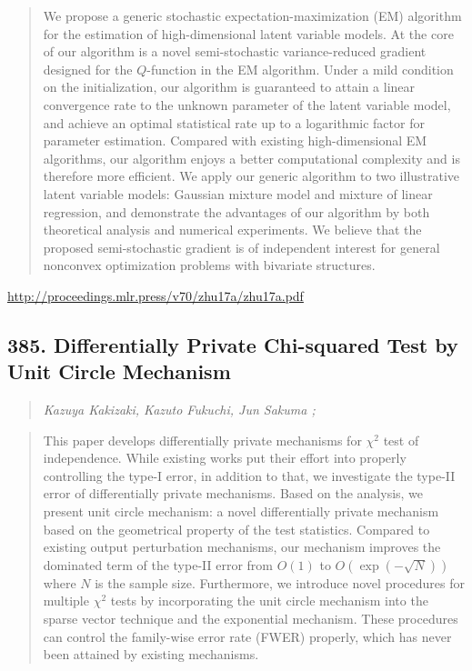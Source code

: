 \documentclass{article}
\begin{document}
\begin{quote}
    We propose a generic stochastic expectation-maximization (EM) algorithm for the estimation of high-dimensional latent variable models. At the core of our algorithm is a novel semi-stochastic variance-reduced gradient designed for the $Q$-function in the EM algorithm. Under a mild condition on the initialization, our algorithm is guaranteed to attain a linear convergence rate to the unknown parameter of the latent variable model, and achieve an optimal statistical rate up to a logarithmic factor for parameter estimation. Compared with existing high-dimensional EM algorithms, our algorithm enjoys a better computational complexity and is therefore more efficient. We apply our generic algorithm to two illustrative latent variable models: Gaussian mixture model and mixture of linear regression, and demonstrate the advantages of our algorithm by both theoretical analysis and numerical experiments. We believe that the proposed semi-stochastic gradient is of independent interest for general nonconvex optimization problems with bivariate structures.  \end{quote}

\href{http://proceedings.mlr.press/v70/zhu17a/zhu17a.pdf}{http://proceedings.mlr.press/v70/zhu17a/zhu17a.pdf}

\subsection{385. Differentially Private Chi-squared Test by Unit Circle Mechanism}

\begin{quote}
\footnotesize{\textit{Kazuya Kakizaki, Kazuto Fukuchi, Jun Sakuma ;}}
\end{quote}

\begin{quote}
    This paper develops differentially private mechanisms for $\chi^2$ test of independence. While existing works put their effort into properly controlling the type-I error, in addition to that, we investigate the type-II error of differentially private mechanisms. Based on the analysis, we present unit circle mechanism: a novel differentially private mechanism based on the geometrical property of the test statistics. Compared to existing output perturbation mechanisms, our mechanism improves the dominated term of the type-II error from $O(1)$ to $O(\exp(-\sqrt{N}))$ where $N$ is the sample size. Furthermore, we introduce novel procedures for multiple $\chi^2$ tests by incorporating the unit circle mechanism into the sparse vector technique and the exponential mechanism. These procedures can control the family-wise error rate (FWER) properly, which has never been attained by existing mechanisms.  \end{quote}
\end{document}
